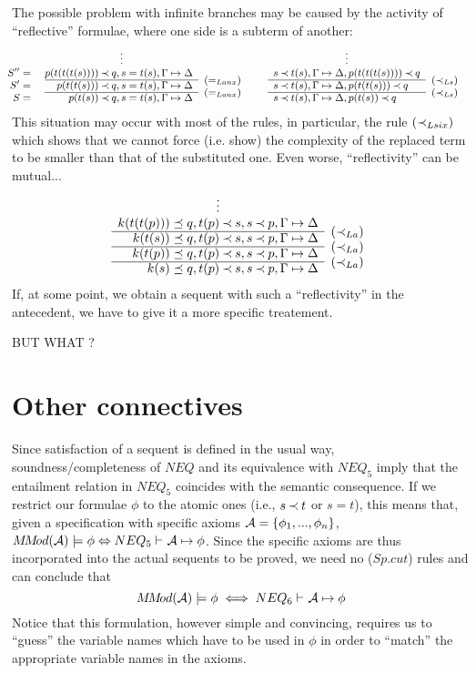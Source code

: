 \begin{PROOF}
The possible problem with infinite branches may be caused by the activity of 
``reflective'' formulae, where one side is a subterm of another:
\[\sma{\begin{array}{l@{\ \ \ \ \ \ }l}
\begin{array}{r@{\ \ \ \ }rl}
& \multicolumn{1}{c}{\vdots} \\
S''= & p(t(t(t(s))))\Incl q, s=t(s), \GSD \\ \cline{2-2}
S'= & p(t(t(s)))\Incl q, s=t(s), \GSD & \rabove{\eLanx} \\ \cline{2-2}
S= & p(t(s))\Incl q, s=t(s), \GSD & \rabove{\eLanx}
\end{array}
&
\begin{array}{ll}
\multicolumn{1}{c}{\vdots} \\
 s\Incl t(s), \GSD, p(t(t(t(s))))\Incl q \cl
 s\Incl t(s), \GSD,  p(t(t(s)))\Incl q & \rabove{\iLs} \cl
 s\Incl t(s), \GSD,  p(t(s))\Incl q & \rabove{\iLs}
\end{array}
\end{array}}
\]
This situation may occur with most of the rules, in particular, the rule $(\mathbin{\prec}_{Lsix})$ which
shows that we cannot force (i.e. show) the complexity of the replaced term to be
smaller than that of the substituted one.
Even worse, ``reflectivity'' can be mutual...
\[
\begin{array}{rl}
\multicolumn{1}{c}{\vdots} \\
k(t(t(p)))\preceq q, t(p)\Incl s, s\Incl p, \GSD \cl
k(t(s))\preceq q, t(p)\Incl s, s\Incl p, \GSD & \rabove{\iLa} \cl
k(t(p))\preceq q, t(p)\Incl s, s\Incl p, \GSD & \rabove{\iLa} \cl
k(s)\preceq q, t(p)\Incl s, s\Incl p, \GSD & \rabove{\iLa}
\end{array}
\]
If, at some point, we obtain a sequent with such a ``reflectivity'' in the
antecedent, we have to give it a more specific treatement.
\begin{center}
BUT WHAT ?
\end{center}
\end{PROOF}


\section{Other connectives}\label{se:connectives}
Since satisfaction of a sequent is defined in the usual way, soundness/completeness
of $NEQ$ and its equivalence with $NEQ_5$ imply that the entailment
relation in $NEQ_5$ coincides with the semantic consequence. If we restrict
our formulae $\phi$ to the atomic ones (i.e., $s\mathbin{\prec} t$ or $s=t$), this
means that, given a specification with specific axioms ${\cal {A}} = \{\phi_1,...,\phi_n\}$, 
 $M\!M\!od({\cal {A}})\models \phi \Leftrightarrow {NEQ_5}\vdash^{{}}{\cal {A}}\mathrel{\mapsto}\phi$. Since the specific
 axioms are thus incorporated into the actual sequents to be proved, we need
 no ($Sp.cut$) rules and can
 conclude that  \[ M\!M\!od({\cal {A}})\models \phi \iff {NEQ_6}\vdash^{{}}{\cal {A}}\mathrel{\mapsto}\phi\]
\noindent
Notice that this formulation, however simple and convincing, requires us to
``guess'' the variable names which have to be used in $\phi$ in order to
``match'' the appropriate variable names in the axioms.

